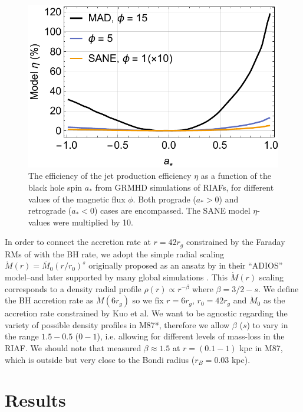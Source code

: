 \documentclass[twocolumn, linenumbers]{aastex62} %
\begin{document}
\begin{figure}[h]
\centering
\includegraphics[width=\linewidth]{figures/model-eta.pdf}
\caption{The efficiency of the jet production efficiency $\eta$ as a function of the black hole spin $a_*$ from GRMHD simulations of RIAFs, for different values of the magnetic flux $\phi$. Both prograde ($a_*>0$) and retrograde ($a_*<0$) cases are encompassed. The SANE model $\eta$-values were multiplied by 10. }
\label{spin-model}
\end{figure}

In order to connect the accretion rate at $r=42 r_g$ constrained by the Faraday RMs of \cite{Kuo2014} with the BH rate, we adopt the simple radial scaling $\dot{M}(r) = \dot{M_0} (r/r_0)^s$ originally proposed as an ansatz by \cite{Blandford1999} in their ``ADIOS'' model--and later supported by many global simulations . This $\dot{M}(r)$ scaling corresponds to a density radial profile $\rho(r) \propto r^{-\beta}$ where $\beta = 3/2-s$. We define the BH accretion rate as $\dot{M}(6 r_g)$ so we fix $r=6r_g$, $r_0=42 r_g$ and $\dot{M}_0$ as the accretion rate constrained by Kuo et al. We want to be agnostic regarding the variety of possible density profiles in M87*, therefore we allow $\beta$ ($s$) to vary in the range $1.5-0.5$ ($0-1$), i.e. allowing for different levels of mass-loss in the RIAF. We should note that \cite{Russell2018}  measured $\beta \approx 1.5$ at $r=(0.1-1)$ kpc in M87, which is outside but very close to the Bondi radius ($r_B = 0.03$ kpc). 






\section{Results} 
\end{document}

